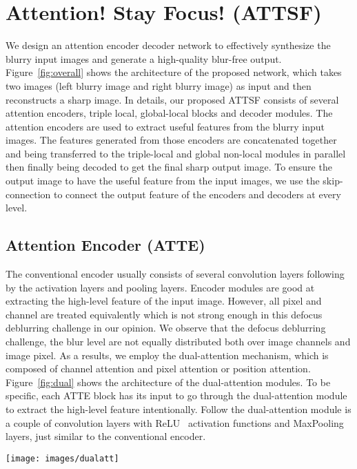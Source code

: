 \documentclass[final]{cvpr}
\begin{document}
\section{Attention! Stay Focus! (ATTSF)}
We design an attention encoder decoder network to effectively synthesize the blurry input images and generate a high-quality blur-free output. Figure~\ref{fig:overall} shows the architecture of the proposed network, which takes two images (left blurry image and right blurry image) as input and then reconstructs a sharp image. In details,  our proposed ATTSF consists of several attention encoders, triple local, global-local blocks and decoder modules. The attention encoders are used to extract useful features from the blurry input images. The features generated from those encoders are concatenated together and being transferred to the triple-local and global non-local modules in parallel then finally being decoded to get the final sharp output image. To ensure the output image to have the useful feature from the input images, we use the skip-connection to connect the output feature of the encoders and decoders at every level.

\subsection{Attention Encoder (ATTE)}

The conventional encoder usually consists of several convolution layers following by the activation layers and pooling layers. Encoder modules are good at extracting the high-level feature of the input image. However, all pixel and channel are treated equivalently which is not strong enough in this defocus deblurring challenge in our opinion. We observe that the defocus deblurring challenge, the blur level are not equally distributed both over image channels and image pixel. As a results, we employ the dual-attention mechanism, which is composed of channel attention and pixel attention or position attention. Figure~\ref{fig:dual} shows the architecture of the dual-attention modules. To be specific, each ATTE block has its input to go through the dual-attention module to extract the high-level feature intentionally. Follow the dual-attention module is a couple of convolution layers with ReLU~\cite{relu} activation functions and MaxPooling layers, just similar to the conventional encoder.

\begin{figure*}
\begin{center}
\texttt{[image: images/dualatt]}
\end{center}
   \caption{Dual Attention Module. GAP, GMP are Global Average Pooling and Global Max Pooling, respectively.  denotes channel-wise multiplication, and  denotes the concatenate operation.}
\label{fig:dual}
\end{figure*}
\end{document}
